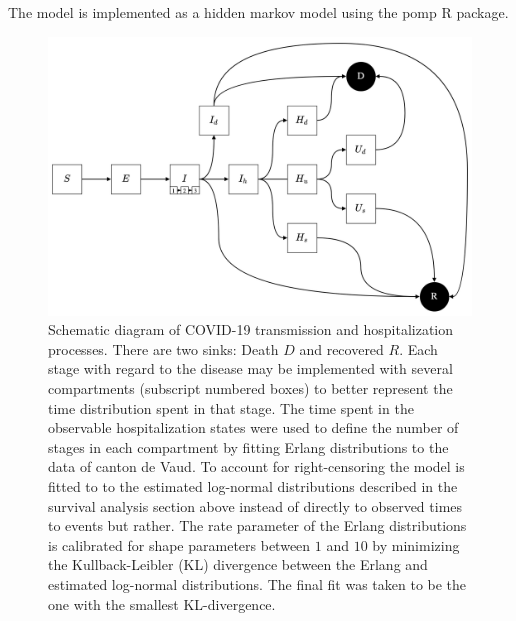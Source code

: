 The model is implemented as a hidden markov model using the pomp R package\cite[-8\baselineskip]{King:StatisticalInferencePartially:2015}. 
 \begin{figure}[!htb]
\begin{center}
\includegraphics{fig_covid-switzerland-npi/fig_supp/diagram.png}
\caption[Schematic diagram of COVID-19 transmission and hospitalization processes]{Schematic diagram of COVID-19 transmission and hospitalization processes. There are two sinks: Death $D$ and recovered $R$. Each stage with regard to the disease may be implemented with several compartments (subscript numbered boxes) to better represent the time distribution spent in that stage. The time spent in the observable hospitalization states were used to define the number of stages in each compartment by fitting Erlang distributions to the data of canton de Vaud. To account for right-censoring the model is fitted to to the estimated log-normal distributions described in the survival analysis section above instead of directly to observed times to events but rather. The rate parameter of the Erlang distributions is calibrated for shape parameters between $1$ and $10$ by minimizing the Kullback-Leibler (KL) divergence between the Erlang and estimated log-normal distributions. The final fit was taken to be the one with the smallest KL-divergence.}
\label{fig:covid-ch-diagram}
\end{center}
\end{figure}
